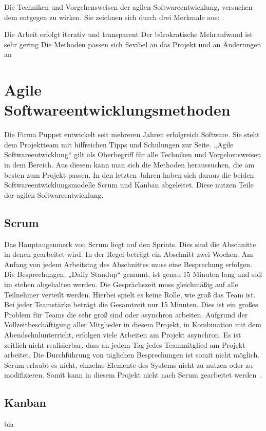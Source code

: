Die Techniken und Vorgehensweisen der agilen Softwareentwicklung, versuchen dem
entgegen zu wirken. Sie zeichnen sich durch drei Merkmale aus:

\begin{outline}
  \1 Die Arbeit erfolgt iterativ und transparent
  \1 Der bürokratische Mehraufwand ist sehr gering
  \1 Die Methoden passen sich flexibel an das Projekt und an Änderungen an
\end{outline}

\section{Agile Softwareentwicklungsmethoden}
Die Firma Puppet entwickelt seit mehreren Jahren erfolgreich Software. Sie
steht dem Projektteam mit hilfreichen Tipps und Schulungen zur Seite. „Agile
Softwareentwicklung“ gilt als Oberbegriff für alle Techniken und
Vorgehensweisen in dem Bereich. Aus diesem kann man sich die Methoden
heraussuchen, die am besten zum Projekt passen. In den letzten Jahren haben
sich daraus die beiden Softwareentwicklungsmodelle Scrum und Kanban abgeleitet.
Diese nutzen Teile der agilen Softwareentwicklung.
\tm%

\subsection{Scrum}
Das Hauptaugenmerk von Scrum liegt auf den Sprints. Dies sind die Abschnitte in
denen gearbeitet wird. In der Regel beträgt ein Abschnitt zwei Wochen. Am
Anfang von jedem Arbeitstag des Abschnittes muss eine Besprechung erfolgen. Die
Besprechungen, „Daily Standup“ genannt, ist genau 15 Minuten lang und soll im
stehen abgehalten werden. Die Gesprächszeit muss gleichmäßig auf alle
Teilnehmer verteilt werden. Hierbei spielt es keine Rolle, wie groß das Team
ist. Bei jeder Teamstärke beträgt die Gesamtzeit nur 15 Minuten. Dies ist ein
großes Problem für Teams die sehr groß sind oder asynchron arbeiten. Aufgrund
der Vollzeitbeschäftigung aller Mitglieder in diesem Projekt, in Kombination
mit dem Abendschulunterricht, erfolgen viele Arbeiten am Projekt asynchron. Es
ist zeitlich nicht realisierbar, dass an jedem Tag jedes Teammitglied am
Projekt arbeitet. Die Durchführung von täglichen Besprechungen ist somit nicht
möglich. Scrum erlaubt es nicht, einzelne Elemente des Systems nicht zu nutzen
oder zu modifizieren. Somit kann in diesem Projekt nicht nach Scrum gearbeitet
werden~\cite{scrum_talk}.
\tm%

\subsection{Kanban}
bla
\tm%

